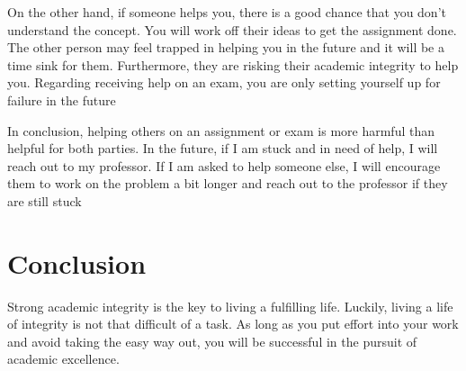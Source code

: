 \documentclass[11pt]{article}
\begin{document}
On the other hand, if someone helps you, there is a good chance that you don’t understand the concept. You will work off their ideas to get the assignment done. The other person may feel trapped in helping you in the future and it will be a time sink for them. Furthermore, they are risking their academic integrity to help you. Regarding receiving help on an exam, you are only setting yourself up for failure in the future  

In conclusion, helping others on an assignment or exam is more harmful than helpful for both parties. In the future, if I am stuck and in need of help, I will reach out to my professor. If I am asked to help someone else, I will encourage them to work on the problem a bit longer and reach out to the professor if they are still stuck 

\section{Conclusion}
Strong academic integrity is the key to living a fulfilling life. Luckily, living a life of integrity is not that difficult of a task. As long as you put effort into your work and avoid taking the easy way out, you will be successful in the pursuit of academic excellence. 

\clearpage
\end{document}
